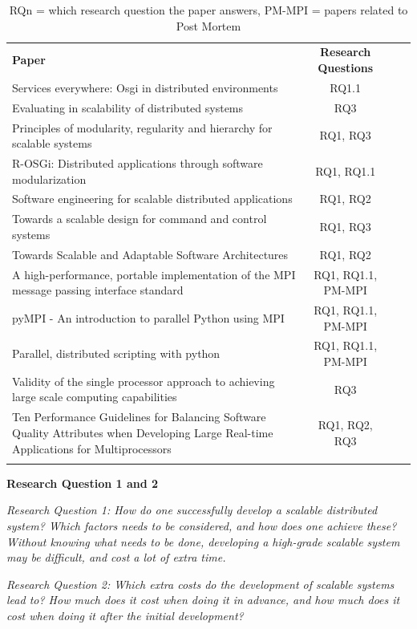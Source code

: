 \documentclass{article}
\begin{document}
{\begin{table}[h!]
\begin{tabular}{p{8cm} c c r}
  \rowcolor[gray]{0.5}
  {\bf Paper} & {\bf Research Questions} \\
  Services everywhere: Osgi in distributed environments & RQ1.1 \\
  Evaluating in scalability of distributed systems & RQ3 \\
  Principles of modularity, regularity and hierarchy for scalable systems & RQ1, RQ3 \\
  R-OSGi: Distributed applications through software modularization & RQ1, RQ1.1 \\
  Software engineering for scalable distributed applications & RQ1, RQ2 \\
  Towards a scalable design for command and control systems & RQ1, RQ3 \\
  Towards Scalable and Adaptable Software Architectures & RQ1, RQ2 \\
  A high-performance, portable implementation of the MPI message passing interface standard & RQ1, RQ1.1, PM-MPI \\
  pyMPI - An introduction to parallel Python using MPI & RQ1, RQ1.1, PM-MPI \\
  Parallel, distributed scripting with python & RQ1, RQ1.1, PM-MPI \\
  Validity of the single processor approach to achieving large scale computing capabilities & RQ3 \\
  Ten Performance Guidelines for Balancing Software Quality Attributes when Developing Large Real-time Applications for Multiprocessors & RQ1, RQ2, RQ3 \\
  
\rowcolor[gray]{0.5}
\end{tabular}
\caption{RQ{n} = which research question the paper answers,
 PM-MPI = papers related to Post Mortem }
\end{table}

\textbf{Research Question 1 and 2}

{\scriptsize \emph{Research Question 1: How do one successfully develop a
scalable distributed system? Which factors needs to be considered, and how does
one achieve these? Without knowing what needs to be done, developing a
high-grade scalable system may be difficult, and cost a lot of extra time.}}

{\scriptsize \emph{Research Question 2: Which extra costs do the development of
scalable systems lead to? How much does it cost when doing it in advance, and
how much does it cost when doing it after the initial development?}}
\\

}
\end{document}
